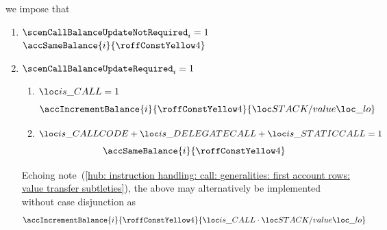 \item[\underline{Setting the \calleeName{} balance operation on account-row $n^°(i + \callFirstCalleeAccountRowOffset)$:}]
	we impose that
	\begin{enumerate}
		\item \If $\scenCallBalanceUpdateNotRequired _{i} = 1$ \Then $\accSameBalance      {i}{\callFirstCalleeAccountRowOffset}$
		\item \If $\scenCallBalanceUpdateRequired    _{i} = 1$ \Then
			\begin{enumerate}
				\item \If $\locIsCall = 1$ \Then
					\[
						\accIncrementBalance
						{i}{\callFirstCalleeAccountRowOffset}{\locStackValueLo}
					\]
				\item \If $\locIsCallcode + \locIsDelegatecall + \locIsStaticcall = 1$ \Then
					\[
						\accSameBalance
						{i}{\callFirstCalleeAccountRowOffset}
					\]
			\end{enumerate}
			\saNote{}
			Echoing
			note~(\ref{hub: instruction handling: call: generalities: first account rows: value transfer subtleties}),
			the above may alternatively be implemented without case disjunction as
			\[
				\accIncrementBalance
				{i}{\callFirstCalleeAccountRowOffset}{\locIsCall \cdot \locStackValueLo}
			\]
	\end{enumerate}

